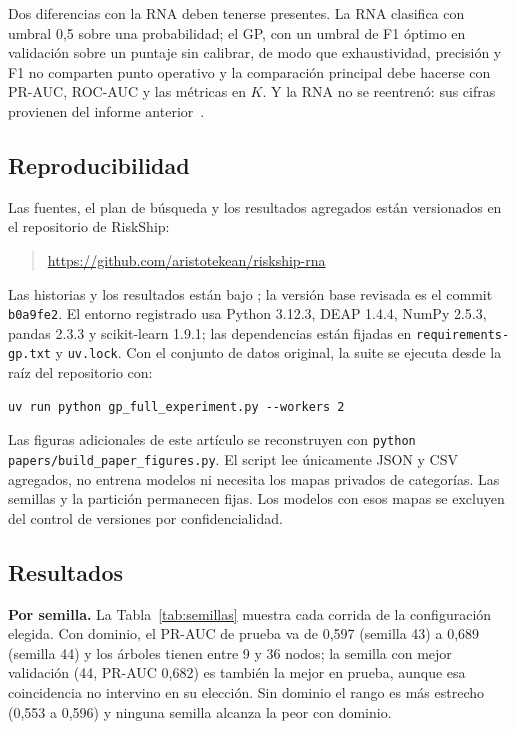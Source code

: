 \documentclass[conference]{IEEEtran}
\begin{document}
Dos diferencias con la RNA deben tenerse presentes. La RNA clasifica con
umbral 0,5 sobre una probabilidad; el GP, con un umbral de F1 óptimo en
validación sobre un puntaje sin calibrar, de modo que exhaustividad, precisión
y F1 no comparten punto operativo y la comparación principal debe hacerse con
PR-AUC, ROC-AUC y las métricas en $K$. Y la RNA no se reentrenó: sus cifras
provienen del informe anterior~\cite{informe_rna}.

\subsection{Reproducibilidad}

Las fuentes, el plan de búsqueda y los resultados agregados están versionados
en el repositorio de RiskShip:
\begin{quote}
\footnotesize
\url{https://github.com/aristotekean/riskship-rna}
\end{quote}

Las historias y los resultados están bajo ;
la versión base revisada es el commit \texttt{b0a9fe2}.
El entorno registrado usa Python 3.12.3, DEAP 1.4.4,
NumPy 2.5.3, pandas 2.3.3 y scikit-learn 1.9.1; las dependencias están
fijadas en \texttt{requirements-gp.txt} y \texttt{uv.lock}. Con el conjunto
de datos original, la suite se ejecuta desde la raíz del repositorio con:

{\footnotesize
\begin{verbatim}
uv run python gp_full_experiment.py --workers 2
\end{verbatim}
}
Las figuras adicionales de este artículo se reconstruyen con
\texttt{python papers/build\_paper\_figures.py}. El script lee únicamente
JSON y CSV agregados, no entrena modelos ni necesita los mapas privados de
categorías. Las semillas y la partición permanecen fijas. Los modelos con
esos mapas se excluyen del control de versiones por confidencialidad.

\subsection{Resultados}

\textbf{Por semilla.} La Tabla~\ref{tab:semillas} muestra cada corrida de la
configuración elegida. Con dominio, el PR-AUC de prueba va de 0,597 (semilla
43) a 0,689 (semilla 44) y los árboles tienen entre 9 y 36 nodos; la semilla
con mejor validación (44, PR-AUC 0,682) es también la mejor en prueba, aunque
esa coincidencia no intervino en su elección. Sin dominio el rango es más
estrecho (0,553 a 0,596) y ninguna semilla alcanza la peor con dominio.
\end{document}
